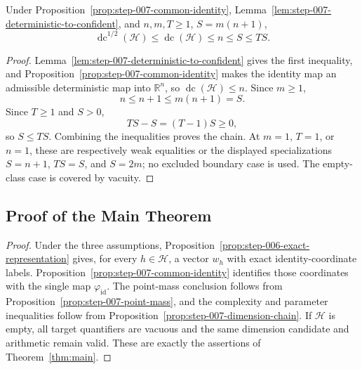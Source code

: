 \begin{proposition}
\label{prop:step-007-dimension-chain}
Under Proposition~\ref{prop:step-007-common-identity},
Lemma~\ref{lem:step-007-deterministic-to-confident}, and
$n,m,T\geq1$, $S=m(n+1)$,
\[
\operatorname{dc}^{1/2}(\mathcal H)
\leq\operatorname{dc}(\mathcal H)\leq n\leq S\leq TS.
\]
\end{proposition}

\begin{proof}
Lemma~\ref{lem:step-007-deterministic-to-confident} gives the first
inequality, and Proposition~\ref{prop:step-007-common-identity} makes the
identity map an admissible deterministic map into $\mathbb R^n$, so
$\operatorname{dc}(\mathcal H)\leq n$.  Since $m\geq1$,
\[
n\leq n+1\leq m(n+1)=S.
\]
Since $T\geq1$ and $S>0$,
\[
TS-S=(T-1)S\geq0,
\]
so $S\leq TS$.  Combining the inequalities proves the chain.  At $m=1$,
$T=1$, or $n=1$, these are respectively weak equalities or the displayed
specializations $S=n+1$, $TS=S$, and $S=2m$; no excluded boundary case is
used.  The empty-class case is covered by vacuity.
\end{proof}

\subsection{Proof of the Main Theorem}
\label{app:main-proof}

\begin{proof}
Under the three assumptions, Proposition~\ref{prop:step-006-exact-representation}
gives, for every $h\in\mathcal H$, a vector $w_h$ with exact identity-coordinate
labels.  Proposition~\ref{prop:step-007-common-identity} identifies those
coordinates with the single map $\varphi_{\mathrm{id}}$.  The point-mass
conclusion follows from Proposition~\ref{prop:step-007-point-mass}, and the
complexity and parameter inequalities follow from
Proposition~\ref{prop:step-007-dimension-chain}.  If $\mathcal H$ is empty,
all target quantifiers are vacuous and the same dimension candidate and
arithmetic remain valid.  These are exactly the assertions of
Theorem~\ref{thm:main}.
\end{proof}
